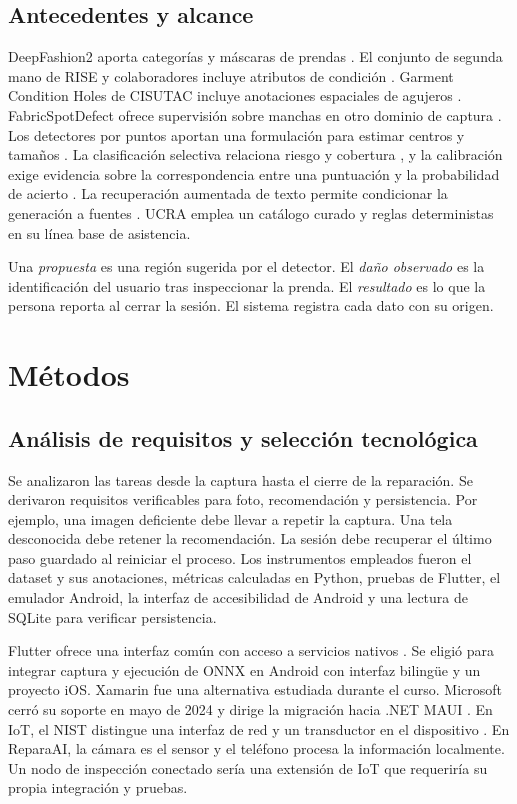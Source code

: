 \documentclass[conference,a4paper]{IEEEtran}
\begin{document}
\subsection{Antecedentes y alcance}
DeepFashion2 aporta categorías y máscaras de prendas \cite{ge2019}. El conjunto de segunda mano de RISE y colaboradores incluye atributos de condición \cite{nauman}. Garment Condition Holes de CISUTAC incluye anotaciones espaciales de agujeros \cite{cisutac}. FabricSpotDefect ofrece supervisión sobre manchas en otro dominio de captura \cite{fabricspot}. Los detectores por puntos aportan una formulación para estimar centros y tamaños \cite{zhou2019}. La clasificación selectiva relaciona riesgo y cobertura \cite{geifman2017}, y la calibración exige evidencia sobre la correspondencia entre una puntuación y la probabilidad de acierto \cite{guo2017}. La recuperación aumentada de texto permite condicionar la generación a fuentes \cite{lewis2020}. UCRA emplea un catálogo curado y reglas deterministas en su línea base de asistencia.

Una \emph{propuesta} es una región sugerida por el detector. El \emph{daño observado} es la identificación del usuario tras inspeccionar la prenda. El \emph{resultado} es lo que la persona reporta al cerrar la sesión. El sistema registra cada dato con su origen.

\section{Métodos}

\subsection{Análisis de requisitos y selección tecnológica}
Se analizaron las tareas desde la captura hasta el cierre de la reparación. Se derivaron requisitos verificables para foto, recomendación y persistencia. Por ejemplo, una imagen deficiente debe llevar a repetir la captura. Una tela desconocida debe retener la recomendación. La sesión debe recuperar el último paso guardado al reiniciar el proceso. Los instrumentos empleados fueron el dataset y sus anotaciones, métricas calculadas en Python, pruebas de Flutter, el emulador Android, la interfaz de accesibilidad de Android y una lectura de SQLite para verificar persistencia.

Flutter ofrece una interfaz común con acceso a servicios nativos \cite{flutter}. Se eligió para integrar captura y ejecución de ONNX en Android con interfaz bilingüe y un proyecto iOS. Xamarin fue una alternativa estudiada durante el curso. Microsoft cerró su soporte en mayo de 2024 y dirige la migración hacia .NET MAUI \cite{xamarin}. En IoT, el NIST distingue una interfaz de red y un transductor en el dispositivo \cite{nist8259}. En ReparaAI, la cámara es el sensor y el teléfono procesa la información localmente. Un nodo de inspección conectado sería una extensión de IoT que requeriría su propia integración y pruebas.
\end{document}
